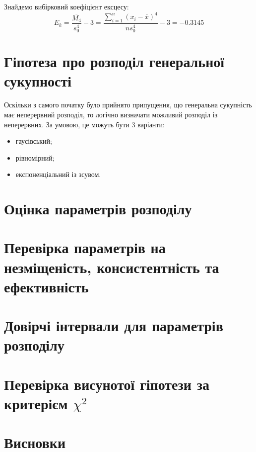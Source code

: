 \documentclass[14pt, a4paper, ukrainian]{extreport}
\begin{document}
	Знайдемо вибірковий коефіцієнт ексцесу:
	$$ E_k = \frac{\overline{M_4}}{s_0^4} - 3= \frac{\sum_{i=1}^{n}(x_i - \overline{x})^4}{ns_0^4} - 3 = -0.3145$$
		
	\chapter{Гіпотеза про розподіл генеральної сукупності}
	
	Оскільки з самого початку було прийнято припущення, що генеральна сукупність має неперервний розподіл, то логічно визначати можливий розподіл із неперервних. За умовою, це можуть бути 3 варіанти:
	\begin{itemize}
		\item гаусівський;
		\item рівномірний;
		\item експоненціальний із зсувом.
	\end{itemize}
	
	\chapter{Оцінка параметрів розподілу}
	\chapter{Перевірка параметрів на незміщеність, консистентність та ефективність}
	\chapter{Довірчі інтервали для параметрів розподілу}
	\chapter{Перевірка висунотої гіпотези за критерієм $\chi^2$}
	\chapter*{Висновки}
	
	
\end{document}
